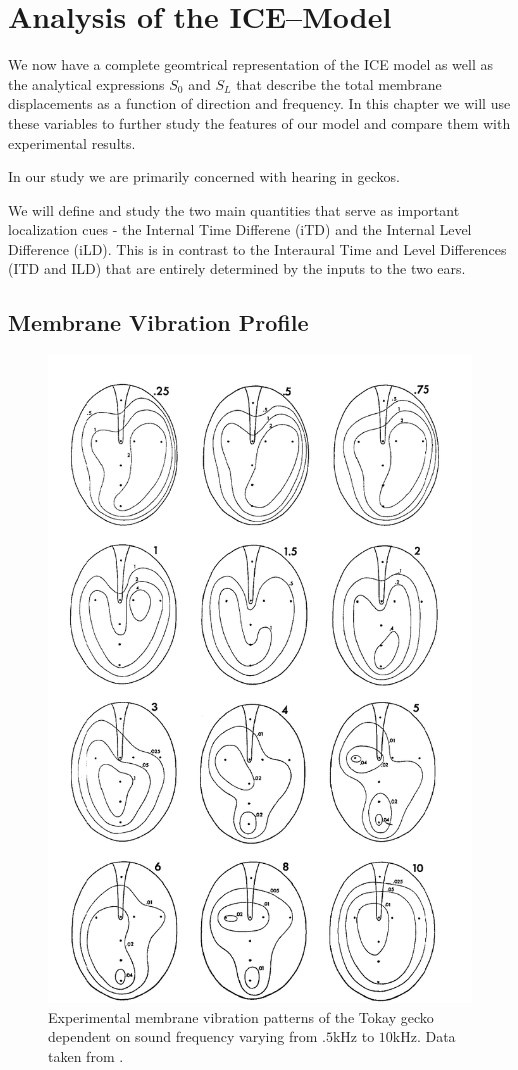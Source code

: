 \chapter{Analysis of the ICE--Model}
We now have a complete geomtrical representation of the ICE model as well as
 the analytical expressions $S_0$ and $S_L$ that describe the total membrane displacements
as a function of direction and frequency. In this chapter we will use these variables
to further study the features of our model and compare them with experimental results.

In our study we are primarily concerned with hearing in geckos.

We will define and study the two main quantities that serve as important localization
cues - the Internal Time Differene (iTD) and the Internal Level Difference (iLD). This
is in contrast to the Interaural Time and Level Differences (ITD and ILD) that are
entirely determined by the inputs to the two ears.
\section{Membrane Vibration Profile}
\begin{figure}[ht!]
 \centering
 \includegraphics[width=.5\linewidth]{Diagrams/manleygeckoear2.png}
 \caption[Tokay gecko tympanum vibration profiles.]{Experimental membrane vibration patterns of the Tokay gecko dependent
 on sound frequency varying from $.5$kHz to $10$kHz. Data taken from \cite{manleygecko1}.}
  \label{manleygeckotympanum}
\end{figure}

